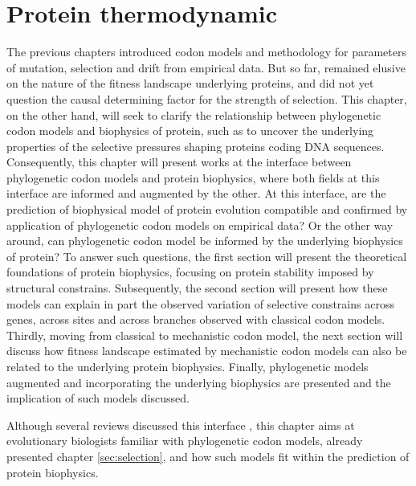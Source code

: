 \chapter{Protein thermodynamic}
{
	\hypersetup{linkcolor=GREYDARK}
	\minitoc
}
\label{sec-intro:physic-protein}

The previous chapters introduced codon models and methodology for parameters of mutation, selection and drift from empirical data. But so far, remained elusive on the nature of the fitness landscape underlying proteins, and did not yet question the causal determining factor for the strength of selection.
This chapter, on the other hand, will seek to clarify the relationship between phylogenetic codon models and biophysics of protein, such as to uncover the underlying properties of the selective pressures shaping proteins coding \acrshort{DNA} sequences.
Consequently, this chapter will present works at the interface between phylogenetic codon models and protein biophysics, where both fields at this interface are informed and augmented by the other. 
At this interface, are the prediction of biophysical model of protein evolution compatible and confirmed by application of phylogenetic codon models on empirical data?
Or the other way around, can phylogenetic codon model be informed by the underlying biophysics of protein?
To answer such questions, the first section will present the theoretical foundations of protein biophysics, focusing on protein stability imposed by structural constrains.
Subsequently, the second section will present how these models can explain in part the observed variation of selective constrains across genes, across sites and across branches observed with classical codon models.
Thirdly, moving from classical to mechanistic codon model, the next section will discuss how fitness landscape estimated by mechanistic codon models can also be related to the underlying protein biophysics.
Finally, phylogenetic models augmented and incorporating the underlying biophysics are presented and the implication of such models discussed.

Although several reviews discussed this interface \citep{Serohijos2014,Sikosek2014,Arenas2015,Echave2017,Bastolla2017}, this chapter aims at evolutionary biologists familiar with phylogenetic codon models, already presented chapter \ref{sec:selection}, and how such models fit within the prediction of protein biophysics.


